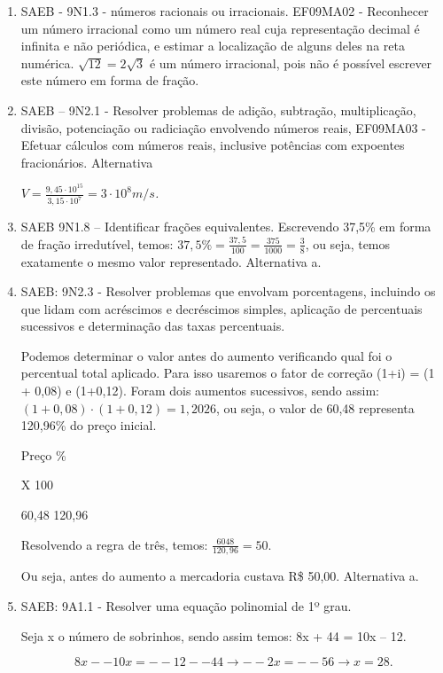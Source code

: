 \begin{enumerate}
\item
SAEB - 9N1.3 - números racionais ou irracionais.
EF09MA02 - Reconhecer um número irracional como um número real cuja
representação decimal é infinita e não periódica, e estimar a
localização de alguns deles na reta numérica.
$\sqrt{12} = 2\sqrt{3}$ é um número irracional, pois não é possível
escrever este número em forma de fração.

\item
SAEB -- 9N2.1 - Resolver problemas de adição, subtração, multiplicação,
divisão, potenciação ou radiciação envolvendo números reais,
EF09MA03 - Efetuar cálculos com números reais, inclusive potências com
expoentes fracionários.
Alternativa

$V = \frac{9,45 \cdot 10^{15}}{3,15 \cdot 10^{7}} = 3 \cdot 10^{8}m/s$\emph{.}

\item
SAEB 9N1.8 -- Identificar frações equivalentes. Escrevendo 37,5\% em
forma de fração irredutível, temos:
$37,5\% = \frac{37,5}{100} = \frac{375}{1000} = \frac{3}{8}$, ou seja,
temos exatamente o mesmo valor representado. Alternativa a.

\item
SAEB: 9N2.3 - Resolver problemas que envolvam porcentagens, incluindo os
que lidam com acréscimos e decréscimos simples, aplicação de percentuais
sucessivos e determinação das taxas percentuais.

Podemos determinar o valor antes do aumento verificando qual foi o
percentual total aplicado. Para isso usaremos o fator de correção (1+i)
= (1 + 0,08) e (1+0,12). Foram dois aumentos sucessivos, sendo assim:
$\left( 1 + 0,08 \right) \cdot \left( 1 + 0,12 \right) = 1,2026$, ou
seja, o valor de 60,48 representa 120,96\% do preço inicial.

Preço \%

X 100

60,48 120,96

Resolvendo a regra de três, temos: $\frac{6048}{120,96} = 50$.

Ou seja, antes do aumento a mercadoria custava R\$ 50,00. Alternativa a.

\item
SAEB: 9A1.1 - Resolver uma equação polinomial de 1º grau.

Seja x o número de sobrinhos, sendo assim temos: 8x + 44 = 10x -- 12.

$$8x -- 10x = -- 12 -- 44 → -- 2x = -- 56 → x = 28.$$


\end{enumerate}

